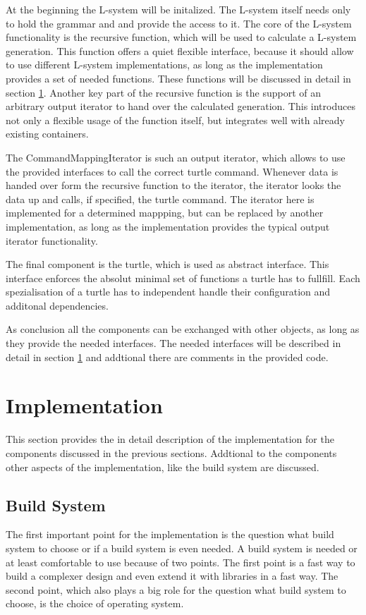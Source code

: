 \documentclass[english]{cpp-hmwk}
\begin{document}
At the beginning the L-system will be initalized. The L-system itself needs only to hold the grammar and and provide the access to it. The core of the L-system functionality is the recursive function, which will be used to calculate a L-system generation. This function offers a quiet flexible interface, because it should allow to use different L-system implementations, as long as the implementation provides a set of needed functions. These functions will be discussed in detail in section \ref{section:impl}. 
Another key part of the recursive function is the support of an arbitrary output iterator to hand over the calculated generation. This introduces not only a flexible usage of the function itself, but integrates well with already existing containers. 

The CommandMappingIterator is such an output iterator, which allows to use the provided interfaces to call the correct turtle command. Whenever data is handed over form the recursive function to the iterator, the iterator looks the data up and calls, if specified, the turtle command. The iterator here is  implemented for a determined mappping, but can be replaced by another implementation, as long as the implementation provides the typical output iterator functionality.

The final component is the turtle, which is used as abstract interface. This interface enforces the absolut minimal set of functions a turtle has to fullfill. Each spezialisation of a turtle has to independent handle their configuration and additonal dependencies.

As conclusion all the components can be exchanged with other objects, as long as they provide the needed interfaces. The needed interfaces will be described in detail in section \ref{section:impl} and addtional there are comments in the provided code.

\clearpage

\section{Implementation}
\label{section:impl}
This section provides the in detail description of the implementation for the components discussed in the previous sections. Addtional to the components other aspects of the implementation, like the build system are discussed.

\subsection{Build System}
\label{section:buildsystem}
The first important point for the implementation is the question what build system to choose or if a build system is even needed. A build system is needed or at least comfortable to use  because of two points. The first point is a fast way to build a complexer design and even extend it with libraries in a fast way. The second point, which also plays a big role for the question what build system to choose, is the choice of operating system.
 
\end{document}
